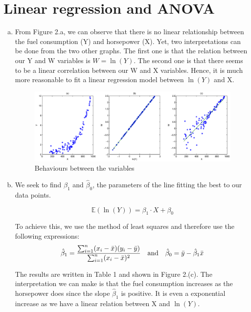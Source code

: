 \documentclass[a4paper]{article}
\begin{document}

\newpage

\section{Linear regression and ANOVA}

\begin{enumerate}[(a)]

\item From Figure 2.a, we can observe that there is no linear relationship between the fuel consumption (Y) and horsepower (X). Yet, two interpretations can be done from the two other graphs. The first one is that the relation between our Y and W variables is $W = \ln(Y)$. The second one is that there seems to be a linear correlation between our W and X variables. Hence, it is much more reasonable to fit a linear regression model between $\ln(Y)$ and X.

\begin{figure}
    \centering
    \includegraphics[width = 15cm]{img/dataset.eps}
    \caption{Behaviours between the variables}
\end{figure}

\item We seek to find $\hat{\beta}_1$ and $\hat{\beta}_0$, the parameters of the line fitting the best to our data points. 

$$\mathbb{E}(\ln(Y)) = \beta_1 \cdot X + \beta_0$$

To achieve this, we use the method of least squares and therefore use the following expressions:
$$\hat{\beta}_1 = \frac{\sum_{i=1}^{n}(x_i-\bar{x})(y_i-\bar{y})}{\sum_{i=1}^n(x_i-\bar{x})^2}
\quad \textup{and} \quad \hat{\beta}_0 = \bar{y} - \hat{\beta}_1 \bar{x}$$

The results are written in Table 1 and shown in Figure 2.(c). The interpretation we can make is that the fuel consumption increases as the horsepower does since the slope $\hat{\beta}_1$ is positive. It is even a exponential increase as we have a linear relation between X and $\ln(Y)$.


\end{enumerate}
\end{document}
